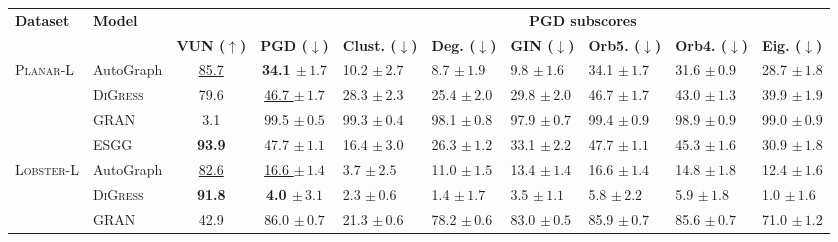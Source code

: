 \begin{tabular}{llccp{1.6cm}p{1.6cm}p{1.6cm}p{1.6cm}p{1.6cm}p{1.6cm}}
\toprule
\textbf{Dataset} & \textbf{Model} &  &  & \multicolumn{6}{c}{\textbf{PGD subscores}} \\
\cmidrule(lr){5-10}
 &  & \textbf{VUN ($\uparrow$)} & \textbf{PGD ($\downarrow$)} & \textbf{Clust. ($\downarrow$)} & \textbf{Deg. ($\downarrow$)} & \textbf{GIN ($\downarrow$)} & \textbf{Orb5. ($\downarrow$)} & \textbf{Orb4. ($\downarrow$)} & \textbf{Eig. ($\downarrow$)} \\
\midrule
\textsc{Planar-L} & AutoGraph & \underline{85.7} & \textbf{34.1 $\pm\,\scriptstyle{1.7}$} & 10.2 $\pm\,\scriptstyle{2.7}$ & 8.7 $\pm\,\scriptstyle{1.9}$ & 9.8 $\pm\,\scriptstyle{1.6}$ & 34.1 $\pm\,\scriptstyle{1.7}$ & 31.6 $\pm\,\scriptstyle{0.9}$ & 28.7 $\pm\,\scriptstyle{1.8}$ \\
 & \textsc{DiGress} & 79.6 & \underline{46.7 $\pm\,\scriptstyle{1.7}$} & 28.3 $\pm\,\scriptstyle{2.3}$ & 25.4 $\pm\,\scriptstyle{2.0}$ & 29.8 $\pm\,\scriptstyle{2.0}$ & 46.7 $\pm\,\scriptstyle{1.7}$ & 43.0 $\pm\,\scriptstyle{1.3}$ & 39.9 $\pm\,\scriptstyle{1.9}$ \\
 & GRAN & 3.1 & 99.5 $\pm\,\scriptstyle{0.5}$ & 99.3 $\pm\,\scriptstyle{0.4}$ & 98.1 $\pm\,\scriptstyle{0.8}$ & 97.9 $\pm\,\scriptstyle{0.7}$ & 99.4 $\pm\,\scriptstyle{0.9}$ & 98.9 $\pm\,\scriptstyle{0.9}$ & 99.0 $\pm\,\scriptstyle{0.9}$ \\
 & ESGG & \textbf{93.9} & 47.7 $\pm\,\scriptstyle{1.1}$ & 16.4 $\pm\,\scriptstyle{3.0}$ & 26.3 $\pm\,\scriptstyle{1.2}$ & 33.1 $\pm\,\scriptstyle{2.2}$ & 47.7 $\pm\,\scriptstyle{1.1}$ & 45.3 $\pm\,\scriptstyle{1.6}$ & 30.9 $\pm\,\scriptstyle{1.8}$ \\
\midrule
\textsc{Lobster-L} & AutoGraph & \underline{82.6} & \underline{16.6 $\pm\,\scriptstyle{1.4}$} & 3.7 $\pm\,\scriptstyle{2.5}$ & 11.0 $\pm\,\scriptstyle{1.5}$ & 13.4 $\pm\,\scriptstyle{1.4}$ & 16.6 $\pm\,\scriptstyle{1.4}$ & 14.8 $\pm\,\scriptstyle{1.8}$ & 12.4 $\pm\,\scriptstyle{1.6}$ \\
 & \textsc{DiGress} & \textbf{91.8} & \textbf{4.0 $\pm\,\scriptstyle{3.1}$} & 2.3 $\pm\,\scriptstyle{0.6}$ & 1.4 $\pm\,\scriptstyle{1.7}$ & 3.5 $\pm\,\scriptstyle{1.1}$ & 5.8 $\pm\,\scriptstyle{2.2}$ & 5.9 $\pm\,\scriptstyle{1.8}$ & 1.0 $\pm\,\scriptstyle{1.6}$ \\
 & GRAN & 42.9 & 86.0 $\pm\,\scriptstyle{0.7}$ & 21.3 $\pm\,\scriptstyle{0.6}$ & 78.2 $\pm\,\scriptstyle{0.6}$ & 83.0 $\pm\,\scriptstyle{0.5}$ & 85.9 $\pm\,\scriptstyle{0.7}$ & 85.6 $\pm\,\scriptstyle{0.7}$ & 71.0 $\pm\,\scriptstyle{1.2}$ \\

\end{tabular}
